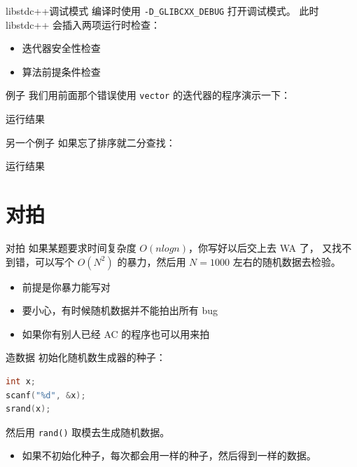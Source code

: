 \documentclass[10pt,mathserif]{beamer}%
\begin{document}
\begin{frame}{libstdc++}{调试模式}
	编译时使用 \lstinline!-D_GLIBCXX_DEBUG! 打开调试模式。
	此时 libstdc++ 会插入两项运行时检查：
	\begin{itemize}
		\item 迭代器安全性检查
		\item 算法前提条件检查
	\end{itemize}
\end{frame}

\begin{frame}{例子}
	我们用前面那个错误使用 \lstinline!vector! 的迭代器的程序演示一下：
	
\end{frame}

\begin{frame}{运行结果}
	
\end{frame}

\begin{frame}{另一个例子}
	如果忘了排序就二分查找：
	
\end{frame}

\begin{frame}{运行结果}
	
\end{frame}

\section{对拍}
\begin{frame}{对拍}
	如果某题要求时间复杂度 $O(nlogn)$，你写好以后交上去 WA 了，
	又找不到错，可以写个 $O(N^2)$ 的暴力，然后用 $N = 1000$
	左右的随机数据去检验。
	\begin{itemize}
		\item 前提是你暴力能写对
		\item 要小心，有时候随机数据并不能拍出所有 bug
		\item 如果你有别人已经 AC 的程序也可以用来拍
	\end{itemize}
\end{frame}

\begin{frame}[fragile]{造数据}
	初始化随机数生成器的种子：
\begin{lstlisting}[language=C++,numbers=none]
int x;
scanf("%d", &x);
srand(x);
\end{lstlisting}
	然后用 \lstinline|rand()| 取模去生成随机数据。
	\begin{itemize}
		\item 如果不初始化种子，每次都会用一样的种子，然后得到一样的数据。
	\end{itemize}
\end{frame}
\end{document}
